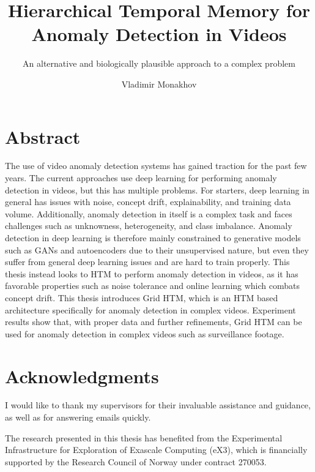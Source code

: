 \documentclass[USenglish]{ifimaster}  %
\title{Hierarchical Temporal Memory for Anomaly Detection in Videos}
\subtitle{An alternative and biologically plausible approach to a complex problem }         %
\author{Vladimir Monakhov}                      %
\begin{document}
\duoforside[
  dept={Department of Informatics},   %
  program={Informatics: Robotics and Intelligent Systems},         %
  long
]                                        %

\frontmatter{}
\chapter*{Abstract} 
The use of video anomaly detection systems has gained traction for the past few years. The current approaches use deep learning for performing anomaly detection in videos, but this has multiple problems. For starters, deep learning in general has issues with noise, concept drift, explainability, and training data volume. Additionally, anomaly detection in itself is a complex task and faces challenges such as unknowness, heterogeneity, and class imbalance. Anomaly detection in deep learning is therefore mainly constrained to generative models such as GANs and autoencoders due to their unsupervised nature, but even they suffer from general deep learning issues and are hard to train properly. This thesis instead looks to HTM to perform anomaly detection in videos, as it has favorable properties such as noise tolerance and online learning which combats concept drift. This thesis introduces Grid HTM, which is an HTM based architecture specifically for anomaly detection in complex videos. Experiment results show that, with proper data and further refinements, Grid HTM can be used for anomaly detection in complex videos such as surveillance footage.

\chapter*{Acknowledgments} 
I would like to thank my supervisors for their invaluable assistance and guidance, as well as for answering emails quickly.
\par
The research presented in this thesis has benefited from the Experimental Infrastructure for Exploration of Exascale Computing (eX3), which is financially supported by the Research Council of Norway under contract 270053.


\mainmatter{}
\tableofcontents
\listoffigures
\listoftables





\backmatter{}
\printbibliography
\end{document}
